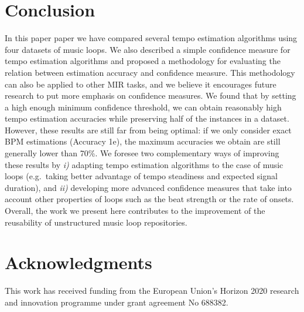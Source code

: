 \documentclass{article}
\begin{document}
\section{Conclusion}\label{sec:conclusion}
In this paper paper we have compared several tempo estimation algorithms using four datasets of music loops.
We also described a simple confidence measure for tempo estimation algorithms and proposed a methodology for evaluating the relation between estimation accuracy and confidence measure. 
This methodology can also be applied to other MIR tasks, and we believe it encourages future research to put more emphasis on confidence measures.
We found that by setting a high enough minimum confidence threshold, we can obtain reasonably high tempo estimation accuracies while preserving half of the instances in a dataset. 
However, these results are still far from being optimal: if we only consider exact BPM estimations (Accuracy 1e), the maximum accuracies we obtain are still generally lower than 70\%.
We foresee two complementary ways of improving these results by \emph{i)} adapting tempo estimation algorithms to the case of music loops (e.g.~taking better advantage of tempo steadiness and expected signal duration), and \emph{ii)} developing more advanced confidence measures that take into account other properties of loops such as the beat strength or the rate of onsets.
Overall, the work we present here contributes to the improvement of the reusability of unstructured music loop repositories.

\section{Acknowledgments} 
This work has received funding from the European Union's Horizon 2020 research and innovation programme under grant agreement No 688382.


\end{document}
